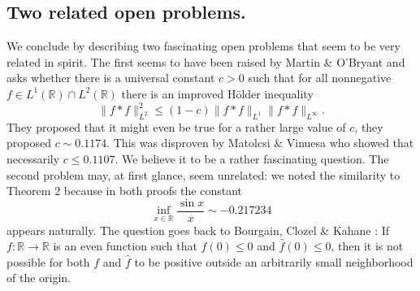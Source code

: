 \documentclass{amsart}
\theoremstyle{remark}
\begin{document}
\subsection{Two related open problems.} We conclude by describing two fascinating open problems that seem to be very related in spirit. The first seems to have been raised by Martin \& O'Bryant \cite[Conjecture 5.2.]{martin3} and asks whether there is a universal constant $c>0$ such that for all nonnegative $f \in L^1(\mathbb{R}) \cap L^2(\mathbb{R})$ there is an improved H\"older inequality
$$ \|f*f\|_{L^2}^2 \leq (1-c) \|f*f\|_{L^1} \|f*f\|_{L^{\infty}}.$$
They proposed that it might even be true for a rather large value of $c$, they proposed $c \sim 0.1174$. This was disproven by Matolcsi \& Vinuesa \cite{mat} who showed that necessarily $c \leq 0.1107$. We believe it to be a rather fascinating question. 
 The second problem may, at first glance, seem unrelated: we noted the similarity to Theorem 2 because in both proofs the constant
$$ \inf_{x \in \mathbb{R}}{\frac{\sin{x}}{x}} \sim -0.217234$$
appears naturally. The question goes back to Bourgain, Clozel \& Kahane \cite{BCK}:
If $f:\mathbb{R} \rightarrow \mathbb{R}$ is an even function such that  $f(0) \leq 0$ and $\widehat{f}(0) \leq 0$, then it is not possible for both $f$ and
$\widehat{f}$ to be positive outside an arbitrarily small neighborhood of the origin. 
\end{document}
